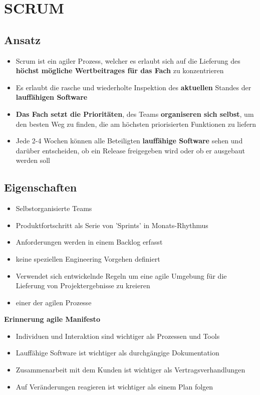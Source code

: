 \documentclass{report}
\theoremstyle{definition}
\theoremstyle{example}
\begin{document}
\chapter{SCRUM}

\section{Ansatz}
\begin{itemize}
	\item Scrum ist ein agiler Prozess, welcher es erlaubt sich auf die Lieferung des \textbf{höchst mögliche Wertbeitrages für das Fach} zu konzentrieren
	\item Es erlaubt die rasche und wiederholte Inspektion des \textbf{aktuellen} Standes der \textbf{lauffähigen Software}
	\item \textbf{Das Fach setzt die Prioritäten}, des Teams \textbf{organiseren sich selbst}, um den besten Weg zu finden, die am höchsten priorisierten Funktionen zu liefern
	\item Jede 2-4 Wochen können alle Beteiligten \textbf{lauffähige Software} sehen und darüber entscheiden, ob ein Release freigegeben wird oder ob er ausgebaut werden soll
\end{itemize}

\section{Eigenschaften}
\begin{itemize}
	\item Selbstorganisierte Teams
	\item Produktfortschritt als Serie von 'Sprints' in Monats-Rhythmus
	\item Anforderungen werden in einem Backlog erfasst
	\item keine speziellen Engineering Vorgehen definiert
	\item Verwendet sich entwickelnde Regeln um eine agile Umgebung für die Lieferung von Projektergebnisse zu kreieren
	\item einer der agilen Prozesse
\end{itemize}

\textbf{Erinnerung agile Manifesto}
\begin{itemize}
	\item Individuen und Interaktion sind wichtiger als Prozessen und Tools
	\item Lauffähige Software ist wichtiger als durchgängige Dokumentation
	\item Zusammenarbeit mit dem Kunden ist wichtiger als Vertragsverhandlungen
	\item Auf Veränderungen reagieren ist wichtiger als einem Plan folgen
\end{itemize}
\end{document}
